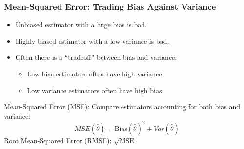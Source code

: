 \begin{frame}
\frametitle{Mean-Squared Error: Trading Bias Against Variance}



  \begin{itemize}
      \item Unbiased estimator with a huge bias is bad.
      \item Highly biased estimator with a low variance is bad.
      \item Often there is a ``tradeoff'' between bias and variance:
        \begin{itemize}
          \item Low bias estimators often have high variance.
          \item Low variance estimators often have high bias.
        \end{itemize}
  \end{itemize}

\pause

\begin{block}{Mean-Squared Error (MSE):}
Compare estimators accounting for \alert{both} bias and variance:
\[MSE(\widehat{\theta}) = \mbox{Bias}(\widehat{\theta})^2 + Var(\widehat{\theta})\]
\pause
\alert{Root Mean-Squared Error (RMSE):} $\sqrt{\mbox{MSE}}$  
\end{block}


\end{frame}
